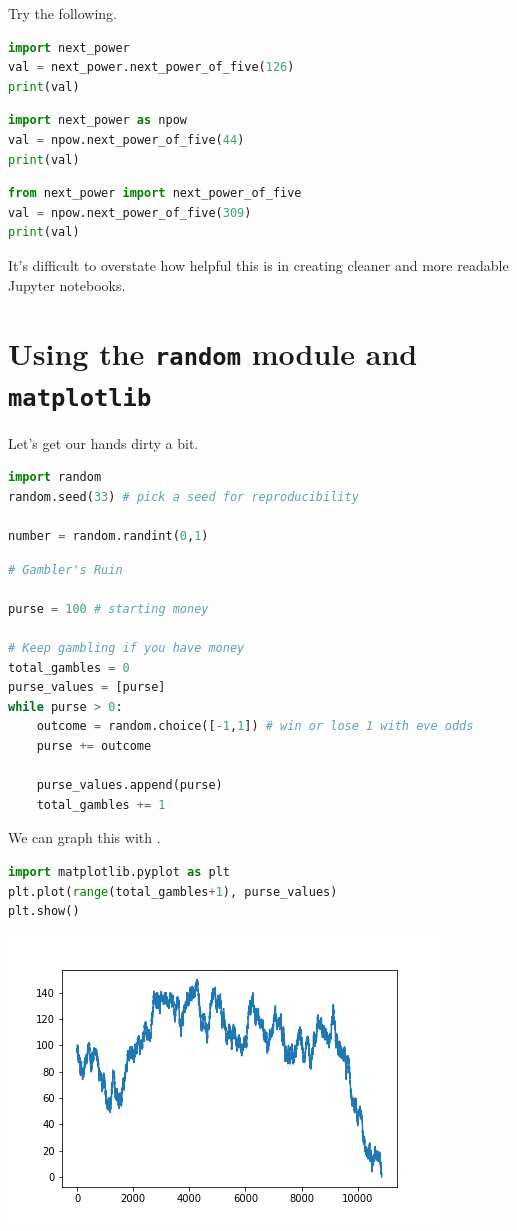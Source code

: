 Try the following.

\begin{lstlisting}[language = Python]
import next_power
val = next_power.next_power_of_five(126)
print(val)
\end{lstlisting}

\begin{lstlisting}[language = Python]
import next_power as npow
val = npow.next_power_of_five(44)
print(val)
\end{lstlisting}

\begin{lstlisting}[language = Python]
from next_power import next_power_of_five
val = npow.next_power_of_five(309)
print(val)
\end{lstlisting}

\noindent It's difficult to overstate how helpful this is in creating cleaner and more readable Jupyter notebooks. 


\section{Using the \texttt{random} module and \texttt{matplotlib}}

Let's get our hands dirty a bit. 

\begin{lstlisting}[language = Python]
import random
random.seed(33) # pick a seed for reproducibility

number = random.randint(0,1)
\end{lstlisting}


\begin{lstlisting}[language = Python]
# Gambler's Ruin

purse = 100 # starting money

# Keep gambling if you have money
total_gambles = 0
purse_values = [purse]
while purse > 0:
    outcome = random.choice([-1,1]) # win or lose 1 with eve odds
    purse += outcome 
    
    purse_values.append(purse) 
    total_gambles += 1 
\end{lstlisting}

\noindent We can graph this with .

\begin{lstlisting}[language = Python]
import matplotlib.pyplot as plt
plt.plot(range(total_gambles+1), purse_values)
plt.show()
\end{lstlisting}

\begin{center}
    \includegraphics[width = .5\textwidth]{gamblers_ruin.png}
\end{center}

